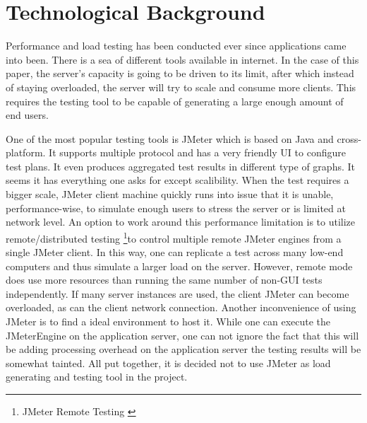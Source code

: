 \chapter{Technological Background}
\label{technological background}
Performance and load testing has been conducted ever since applications came into been. There is a sea of different tools available in internet. In the case of this paper, the server's capacity is going to be driven to its limit, after which instead of staying overloaded, the server will try to scale and consume more clients. This requires the testing tool to be capable of generating a large enough amount of end users. 

One of the most popular testing tools is JMeter which is based on Java and cross-platform. It supports multiple protocol and has a very friendly UI to configure test plans. It even produces aggregated test results in different type of graphs. It seems it has everything one asks for except scalibility. When the test requires a bigger scale, JMeter client machine quickly runs into issue that it is unable, performance-wise, to simulate enough users to stress the server or is limited at network level. An option to work around this performance limitation is to utilize remote/distributed testing \footnote{JMeter Remote Testing \cite{JMeterRemote}}to control multiple remote JMeter engines from a single JMeter client. In this way, one can replicate a test across many low-end computers and thus simulate a larger load on the server. However, remote mode does use more resources than running the same number of non-GUI tests independently. If many server instances are used, the client JMeter can become overloaded, as can the client network connection. Another inconvenience of using JMeter is to find a ideal environment to host it. While one can execute the JMeterEngine on the application server, one can not ignore the fact that this will be adding processing overhead on the application server the testing results will be somewhat tainted. All put together, it is decided not to use JMeter as load generating and testing tool in the project. 





  
